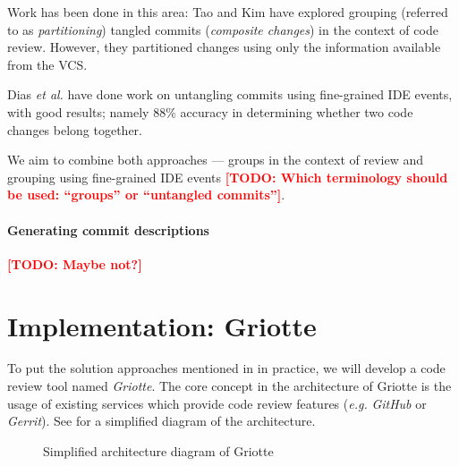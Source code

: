 \documentclass[conference,a4paper]{IEEEtran}
\newcommand{\todo}[1]{\textbf{\textcolor{red}{{[}TODO: #1{]}}}}
\begin{document}
Work has been done in this area: Tao and Kim\cite{Tao15a} have
explored grouping (referred to as \textit{partitioning}) tangled
commits (\textit{composite changes}) in the context of code
review. However, they partitioned changes using only the information
available from the VCS.

Dias \textit{et al.}\cite{Dias15a} have done work on untangling
commits using fine-grained IDE events, with good results; namely 88\%
accuracy in determining whether two code changes belong together.

We aim to combine both approaches --- groups in the context of review
and grouping using fine-grained IDE events \todo{Which terminology
  should be used: ``groups'' or ``untangled commits''}.

\paragraph{Generating commit descriptions}

\todo{Maybe not?}

\section{Implementation: Griotte}
\label{sec:impl-griotte}

To put the solution approaches mentioned in
 in practice, we will develop a code
review tool named \textit{Griotte}. The core concept in the
architecture of Griotte is the usage of existing services which
provide code review features (\textit{e.g.} \textit{GitHub} or
\textit{Gerrit}). See  for a simplified diagram of
the architecture.
\begin{figure}[t]
  \caption{Simplified architecture diagram of Griotte}
  \label{fig:diagram}
\end{figure}
\end{document}
